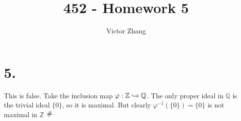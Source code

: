 \documentclass{article}
\title{452 - Homework 5}
\author{Victor Zhang}
\date{}
\newcommand{\contra}{\raisebox{\depth}{\#}}
\begin{document}
\maketitle

\section*{5.}
This is false. Take the inclusion map $\varphi: \mathbb{Z} \xhookrightarrow{} \mathbb{Q}$. The only proper ideal in $\mathbb{Q}$ is the trivial ideal $\{0\}$, so it is maximal. But clearly $\varphi^{-1}(\{0\}) = \{0\}$ is not maximal in $\mathbb{Z}$ $\contra$
\end{document}
